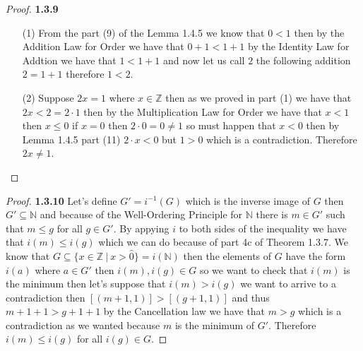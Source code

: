 \documentclass[11pt]{article}
\newcommand{\N}{\mathbb{N}}
\newcommand{\Z}{\mathbb{Z}}
\theoremstyle{definition}
\begin{document}
    \begin{proof}{\textbf{1.3.9}}
        \begin{itemize}
            \item [(1)]
            From the part (9) of the Lemma 1.4.5 we know that $0 < 1$ then by the
            Addition Law for Order we have that $0 + 1 < 1 + 1$ by the Identity Law for
            Addtion we have that $1 < 1+1$ and now let us call $2$ the following addition
            $2 = 1+1$ therefore $1 < 2$.
            \item [(2)]
            Suppose $2x = 1$ where $x \in \Z$ then as we proved in part (1) we have that
            $2x < 2 = 2 \cdot 1$ then by the Multiplication Law for Order we have that
            $x < 1$ then $x \leq 0$ if $x = 0$ then $2 \cdot 0 = 0 \neq 1$ so must
            happen that $x < 0$ then by Lemma 1.4.5 part (11) $2 \cdot x < 0$ but
            $1 > 0$ which is a contradiction. Therefore $2x \neq 1$. 
        \end{itemize}
    \end{proof}
    \begin{proof}{\textbf{1.3.10}}
        Let's define $G' = i^{-1}(G)$ which is the inverse image of $G$ then
        $G' \subseteq \N$ and because of the Well-Ordering Principle for $\N$ there is
        $m \in G'$ such that $m \leq g$ for all $g \in G'$. By appying $i$ to both sides
        of the inequality we have that $i(m) \leq i(g)$ which we can do because of part
        4c of Theorem 1.3.7.
        We know that $G \subseteq \{x \in \Z ~|~x>\hat{0}\} = i(\N)$ then the elements
        of $G$ have the form $i(a)$ where $a \in G'$ then $i(m),i(g) \in G$ so we want
        to check that $i(m)$ is the minimum then let's suppose that $i(m) > i(g)$ we
        want to arrive to a contradiction then $[(m+1,1)] > [(g+1,1)]$ and thus
        $m+1+1>g+1+1$ by the Cancellation law we have that $m>g$ which is a
        contradiction as we wanted because $m$ is the minimum of $G'$. Therefore
        $i(m) \leq i(g)$ for all $i(g) \in G$.         
    \end{proof}
\end{document}
